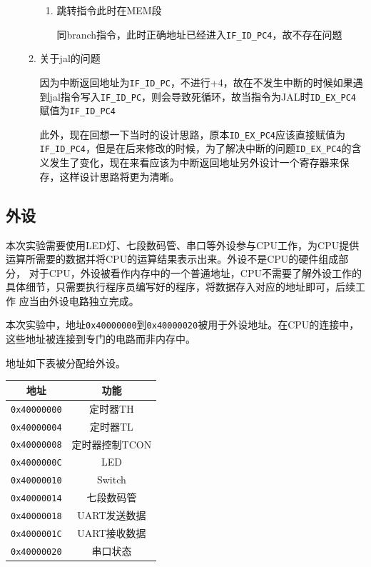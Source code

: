 \documentclass{ctexart}
\begin{document}
\begin{enumerate}
\begin{enumerate}
\begin{enumerate}
\item 跳转指令此时在MEM段

同branch指令，此时正确地址已经进入\verb"IF_ID_PC4"，故不存在问题
\end{enumerate}

\item 关于jal的问题

因为中断返回地址为\verb"IF_ID_PC"，不进行+4，故在不发生中断的时候如果遇到jal指令写入\verb"IF_ID_PC"，则会导致死循环，故当指令为JAL时\verb"ID_EX_PC4"赋值为\verb"IF_ID_PC4"

此外，现在回想一下当时的设计思路，原本\verb"ID_EX_PC4"应该直接赋值为\verb"IF_ID_PC4"，但是在后来修改的时候，为了解决中断的问题\verb"ID_EX_PC4"的含义发生了变化，现在来看应该为中断返回地址另外设计一个寄存器来保存，这样设计思路将更为清晰。
\end{enumerate}


		\end{enumerate}

		\subsection{外设}
		本次实验需要使用LED灯、七段数码管、串口等外设参与CPU工作，为CPU提供运算所需要的数据并将CPU的运算结果表示出来。外设不是CPU的硬件组成部分，
		对于CPU，外设被看作内存中的一个普通地址，CPU不需要了解外设工作的具体细节，只需要执行程序员编写好的程序，将数据存入对应的地址即可，后续工作
		应当由外设电路独立完成。

		本次实验中，地址\verb"0x40000000"到\verb"0x40000020"被用于外设地址。在CPU的连接中，这些地址被连接到专门的电路而非内存中。

		地址如下表被分配给外设。

		\begin{table}[ht]
			\centering
			\begin{tabular}{|c|c|}
				\hline
				地址 & 功能  \\
				\hline
				\verb"0x40000000" & 定时器TH \\
				\verb"0x40000004" & 定时器TL \\
				\verb"0x40000008" & 定时器控制TCON \\
				\verb"0x4000000C" & LED \\
				\verb"0x40000010" & Switch \\
				\verb"0x40000014" & 七段数码管 \\
				\verb"0x40000018" & UART发送数据 \\
				\verb"0x4000001C" & UART接收数据 \\
				\verb"0x40000020" & 串口状态 \\ 
				\hline
			\end{tabular}
		\end{table}
\end{document}
